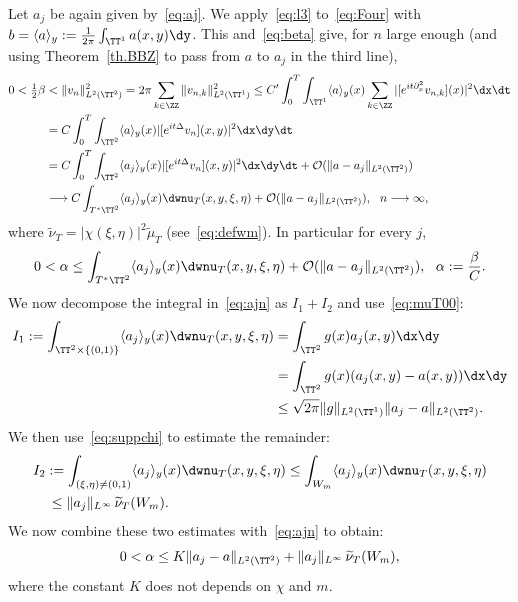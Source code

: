Let $ a_j $ be again given by~\eqref{eq:aj}. We apply~\eqref{eq:l3} to~\eqref{eq:Four} with $ b = \langle a \rangle_y := \frac{1}{ 2 \pi} \int_{ \TT^1} a (x, y) \dy $. This and~\eqref{eq:beta} give, for $ n $ large enough (and using Theorem~\ref{th.BBZ} to pass from $ a$ to $ a_j $ in the third line),
\begin{align*}
0 < \tfrac12 \beta & < \| v_n \|_{L^2 (\TT^2) }^2 = 2 \pi \sum_{k \in \ZZ } \| v_{n,k} \|_{ L^2 (\TT^1) }^2
\leq C' \int_0^T \int_{\TT^1} \langle a \rangle_y (x) \sum_{ k \in \ZZ} | [e^{ it \partial_x^2 } v_{n,k}] (x) |^2 \dx \dt
\\
& = C \int_0^T \int_{ \TT^2 } \langle a \rangle_y (x) |[e^{ it \Delta } v_n] (x, y) |^2 \dx \dy \dt \\
& = C \int_0^T \int_{\TT^2} \langle a_j \rangle_y (x) | [e^{ it \Delta } v_n] (x, y) |^2 \dx \dy \dt +
\mathcal O (\| a - a_j \|_{L^2 (
\TT^2) }) \\
& \longrightarrow C \int_{T^* \TT^2 }
\langle a_j \rangle_y (x) \dwnu_T (x, y, \xi, \eta) + \mathcal O (\| a - a_j \|_{L^2 (
\TT^2) }), \ \ n \longrightarrow \infty,
\end{align*}
where $ \widetilde \nu_T = |\chi (\xi, \eta)|^2 \widetilde \mu_T $ (see~\eqref{eq:defwm}). In particular for every $ j $,
\begin{equation}\label{eq:ajn}
0 < \alpha \leq \int_{T^* \TT^2 }
\langle a_j \rangle_y (x) \dwnu_T (x, y, \xi, \eta) + \mathcal O (\| a - a_j \|_{L^2 (
\TT^2) }), \ \
\alpha := \frac{ \beta}{ C }.
\end{equation}
We now decompose the integral in~\eqref{eq:ajn} as $ I_1 + I_2 $ and use~\eqref{eq:muT00}:
\begin{equation}\label{eq:aj1}
\begin{split}
I_1 := \int_{ \TT^2 \times \{ (0, 1) \} } \langle a_j \rangle_y (x) \dwnu_T (x, y, \xi, \eta) & =
\int_{ \TT^2 } g (x) a_j (x, y) \dx \dy \\
& =
\int_{ \TT^2 } g (x) (a_j (x, y) - a (x, y)) \dx \dy \\
& \leq {\sqrt{ 2 \pi }} \| g \|_{ L^2 (\TT^1) } \| a_j - a \|_{L^2 (\TT^2) }.
\end{split}
\end{equation}
We then use~\eqref{eq:suppchi} to estimate the remainder:
\[
\begin{split}
I_2 & := \int_{ (\xi, \eta) \neq (0, 1) }
\langle a_j \rangle_y (x) \dwnu_T (x, y, \xi, \eta)
\leq \int_{W_m } \langle a_j \rangle_y (x) \dwnu_T (x, y, \xi, \eta) \\
&\, \leq \| a_j \|_{ L^\infty } \, \widetilde \nu_T (W_m).
\end{split}
\]
We now combine these two estimates with~\eqref{eq:ajn} to obtain:
\[
0 < \alpha \leq K \| a_j - a \|_{L^2 (\TT^2) } + \| a_j \|_{ L^\infty } \, \widetilde \nu_T (W_m),
\]
where the constant $ K $ does not depends on $ \chi $ and $ m $.

